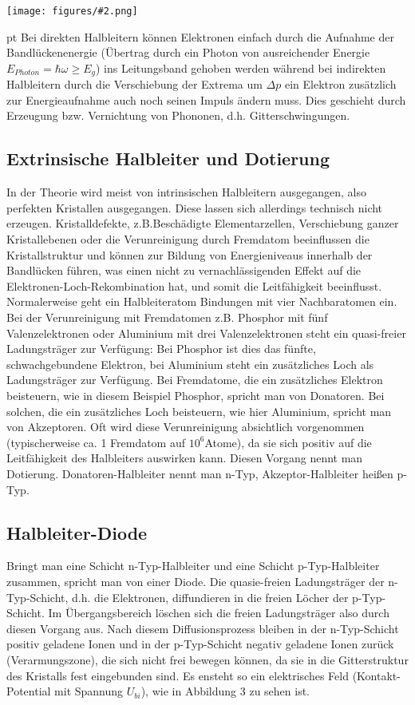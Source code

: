 \documentclass[12pt]{article}
\newcommand{\gra}[3][0.7]{
	\begin{minipage}[h!]{\textwidth}
		\centering
		\texttt{[image: figures/\#2.png]}
		\captionof{figure}{#3}
	\end{minipage}
	\vskip 30 pt
	}
\begin{document}
\gra{(in)direkte_Halbleiter}{Direkte und indirekte Halbleiter}\cite{staat}
Bei direkten Halbleitern können Elektronen einfach durch die Aufnahme der Bandlückenenergie (Übertrag durch ein Photon von ausreichender Energie $E_{Photon}=\hbar\omega\geq E_g$) ins Leitungsband gehoben werden während bei indirekten Halbleitern durch die Verschiebung der Extrema um $\Delta p$ ein Elektron zusätzlich zur Energieaufnahme auch noch seinen Impuls ändern muss. Dies geschieht durch Erzeugung bzw. Vernichtung von Phononen, d.h. Gitterschwingungen.

\subsection{Extrinsische Halbleiter und Dotierung}

In der Theorie wird meist von intrinsischen Halbleitern ausgegangen, also perfekten Kristallen ausgegangen.  Diese lassen sich allerdings technisch nicht erzeugen. Kristalldefekte, z.B.Beschädigte Elementarzellen, Verschiebung ganzer Kristallebenen oder die Verunreinigung durch Fremdatom beeinflussen die Kristallstruktur und können zur Bildung von Energieniveaus innerhalb der Bandlücken führen, was einen nicht zu vernachlässigenden Effekt auf die Elektronen-Loch-Rekombination hat, und somit die Leitfähigkeit beeinflusst.\\
Normalerweise geht ein Halbleiteratom Bindungen mit vier Nachbaratomen ein. Bei der Verunreinigung mit Fremdatomen z.B. Phosphor mit fünf Valenzelektronen oder Aluminium mit drei Valenzelektronen steht ein quasi-freier Ladungsträger zur Verfügung: Bei Phosphor ist dies das fünfte, schwachgebundene Elektron, bei Aluminium steht ein zusätzliches Loch als Ladungsträger zur Verfügung. Bei Fremdatome, die ein zusätzliches Elektron beisteuern, wie in diesem Beispiel Phosphor, spricht man von Donatoren. Bei solchen, die ein zusätzliches Loch beisteuern, wie hier Aluminium, spricht man von Akzeptoren.
Oft wird diese Verunreinigung absichtlich vorgenommen (typischerweise ca. 1 Fremdatom auf $10^6$Atome), da sie sich positiv auf die Leitfähigkeit des Halbleiters auswirken kann. Diesen Vorgang nennt man Dotierung. Donatoren-Halbleiter nennt man n-Typ, Akzeptor-Halbleiter heißen p-Typ.
\subsection{Halbleiter-Diode}

Bringt man eine Schicht n-Typ-Halbleiter und eine Schicht p-Typ-Halbleiter zusammen, spricht man von einer Diode. Die quasie-freien Ladungsträger der n-Typ-Schicht, d.h. die Elektronen, diffundieren in die freien Löcher der p-Typ-Schicht. Im Übergangsbereich löschen sich die freien Ladungsträger also durch diesen Vorgang aus. 
Nach diesem Diffusionsprozess bleiben in der n-Typ-Schicht positiv geladene Ionen und in der p-Typ-Schicht negativ geladene Ionen zurück (Verarmungszone), die sich nicht frei bewegen können, da sie in die Gitterstruktur des Kristalls fest eingebunden sind. Es ensteht so ein elektrisches Feld (Kontakt-Potential mit Spannung $U_{bi}$), wie in Abbildung 3 zu sehen ist. 
\end{document}
